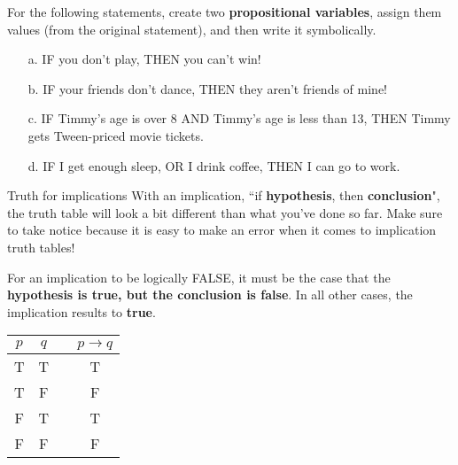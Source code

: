 {    
    \begin{questionNOGRADE}{\thequestion}
        For the following statements, create two
        \textbf{propositional variables}, assign them values (from
        the original statement), and then write it symbolically.

        \begin{enumerate}
            \item[a.] IF you don't play, THEN you can't win!
            \item[b.] IF your friends don't dance, THEN they aren't friends of mine!
            \item[c.] IF Timmy's age is over 8 AND Timmy's age is less than 13, THEN Timmy gets Tween-priced movie tickets.
            \item[d.] IF I get enough sleep, OR I drink coffee, THEN I can go to work.
        \end{enumerate}        
    \end{questionNOGRADE}

    \newpage

        \begin{intro}{Truth for implications}
            With an implication, ``if \textbf{hypothesis}, then \textbf{conclusion}",
            the truth table will look a bit different than what you've done so far.
            Make sure to take notice because it is easy to make an error when it
            comes to implication truth tables!

            For an implication to be logically FALSE, it must be the case that
            the \textbf{hypothesis is true, but the conclusion is false}. In
            all other cases, the implication results to \textbf{true}.

            \begin{center}
                \begin{tabular}{| c | c | c | c |}
                    \hline{}
                    $p$ & $q$ & & $p \to q$
                    \\ \hline
                    T & T & & T
                    \\ \hline

                    T & F & & F
                    \\ \hline

                    F & T & & T
                    \\ \hline

                    F & F & & F
                    \\ \hline
                \end{tabular}
            \end{center}


\end{intro}}
